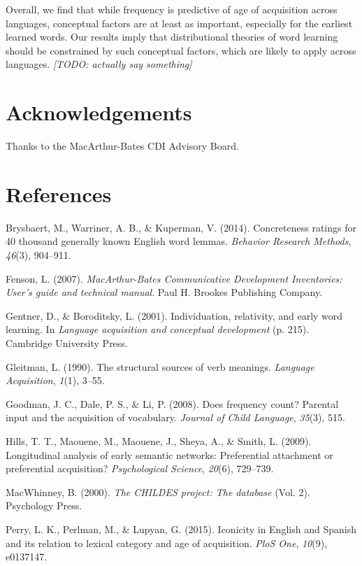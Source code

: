 \documentclass[10pt, letterpaper]{article}
\begin{document}
Overall, we find that while frequency is predictive of age of
acquisition across languages, conceptual factors are at least as
important, especially for the earliest learned words. Our results imply
that distributional theories of word learning should be constrained by
such conceptual factors, which are likely to apply across languages.
\emph{{[}TODO: actually say something{]}}

\section{Acknowledgements}\label{acknowledgements}

Thanks to the MacArthur-Bates CDI Advisory Board.

\section{References}\label{references}

\setlength{\parindent}{-0.1in} \setlength{\leftskip}{0.125in} \noindent

Brysbaert, M., Warriner, A. B., \& Kuperman, V. (2014). Concreteness
ratings for 40 thousand generally known English word lemmas.
\emph{Behavior Research Methods}, \emph{46}(3), 904--911.

Fenson, L. (2007). \emph{MacArthur-Bates Communicative Development
Inventories: User's guide and technical manual}. Paul H. Brookes
Publishing Company.

Gentner, D., \& Boroditsky, L. (2001). Individuation, relativity, and
early word learning. In \emph{Language acquisition and conceptual
development} (p. 215). Cambridge University Press.

Gleitman, L. (1990). The structural sources of verb meanings.
\emph{Language Acquisition}, \emph{1}(1), 3--55.

Goodman, J. C., Dale, P. S., \& Li, P. (2008). Does frequency count?
Parental input and the acquisition of vocabulary. \emph{Journal of Child
Language}, \emph{35}(3), 515.

Hills, T. T., Maouene, M., Maouene, J., Sheya, A., \& Smith, L. (2009).
Longitudinal analysis of early semantic networks: Preferential
attachment or preferential acquisition? \emph{Psychological Science},
\emph{20}(6), 729--739.

MacWhinney, B. (2000). \emph{The CHILDES project: The database} (Vol.
2). Psychology Press.

Perry, L. K., Perlman, M., \& Lupyan, G. (2015). Iconicity in English
and Spanish and its relation to lexical category and age of acquisition.
\emph{PloS One}, \emph{10}(9), e0137147.
\end{document}

